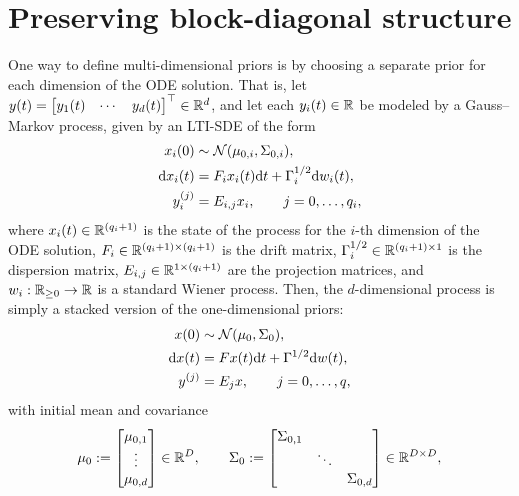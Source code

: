 \documentclass{mimosis}
\begin{document}
\section{Preserving block-diagonal structure}
\label{sec:org0773039}
\label{sec:highdim:bd}
\label{sec:ode-filter-complexity:bd-priors}
One way to define multi-dimensional priors is by choosing a separate prior for each dimension of the ODE solution.
That is, let \(y(t) = \begin{bmatrix} y_1(t) & \cdots & y_d(t) \end{bmatrix}^\top \in \mathbb{R}^d\), and let each \(y_i(t) \in \mathbb{R}\) be modeled by a Gauss--Markov process, given by an LTI-SDE of the form
\begin{subequations}
\begin{align}
  \st_i(0) &\sim \N( \mean{0,i}, \cov{0,i} ), \\
  \dd \st_i(t) &= \drift_i \st_i(t) \dd t + \disp_i \dd \wiener_i(t), \\
  \val_i^{(j)} &= \proj{i,j} \st_i, \qquad j = 0, \dots, q_i,
\end{align}
\end{subequations}
where \(x_i(t) \in \mathbb{R}^{(q_i+1)}\) is the state of the process for the \(i\)-th dimension of the ODE solution,
\(F_i \in \mathbb{R}^{(q_i+1) \times (q_i+1)}\) is the drift matrix,
\(\Gamma^{1/2}_i \in \mathbb{R}^{(q_i+1) \times 1}\) is the dispersion matrix,
\(E_{i,j} \in \mathbb{R}^{1 \times (q_i+1)}\) are the projection matrices,
and \(w_i: \mathbb{R}_{\geq0} \to \mathbb{R}\) is a standard Wiener process.
Then, the \(d\)-dimensional process is simply a stacked version of the one-dimensional priors:
\begin{subequations}
\begin{align}
  \st(0) &\sim \N( \mean{0}, \cov{0} ), \\
  \dd \st(t) &= \drift \st(t) \dd t + \disp \dd \wiener(t), \\
  \val^{(j)} &= \proj{j} \st, \qquad j = 0, \dots, q,
\end{align}
\end{subequations}
with initial mean and covariance
\begin{equation}
  \mean{0} := \begin{bmatrix} \mean{0,1} \\ \vdots \\ \mean{0,d} \end{bmatrix} \in \mathbb{R}^{D},
\qquad
  \cov{0} := \mqty[\dmat{\cov{0,1}, \ddots, \cov{0,d}}] \in \mathbb{R}^{D \times D},
\end{equation}
\end{document}
